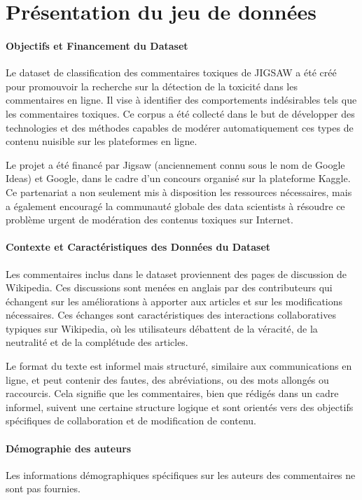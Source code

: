 
\chapter{Présentation du jeu de données}

\subsubsection*{Objectifs et Financement du Dataset}
Le dataset de classification des commentaires toxiques de JIGSAW a été créé pour promouvoir la recherche sur la détection de la toxicité dans les commentaires en ligne.
Il vise à identifier des comportements indésirables tels que les commentaires toxiques.
Ce corpus a été collecté dans le but de développer des technologies et des méthodes capables de modérer automatiquement ces types de contenu nuisible sur les plateformes en ligne.

Le projet a été financé par Jigsaw (anciennement connu sous le nom de Google Ideas) et Google, dans le cadre d'un concours organisé sur la plateforme Kaggle. 
Ce partenariat a non seulement mis à disposition les ressources nécessaires, mais a également encouragé la communauté globale des data scientists à résoudre ce problème urgent de modération des contenus toxiques sur Internet.

\subsubsection*{Contexte et Caractéristiques des Données du Dataset }
Les commentaires inclus dans le dataset proviennent des pages de discussion de Wikipedia. 
Ces discussions sont menées en anglais par des contributeurs qui échangent sur les améliorations à apporter aux articles et sur les modifications nécessaires. 
Ces échanges sont caractéristiques des interactions collaboratives typiques sur Wikipedia, où les utilisateurs débattent de la véracité, de la neutralité et de la complétude des articles.

Le format du texte est informel mais structuré, similaire aux communications en ligne, et peut contenir des fautes, des abréviations, ou des mots allongés ou raccourcis.
Cela signifie que les commentaires, bien que rédigés dans un cadre informel, suivent une certaine structure logique et sont orientés vers des objectifs spécifiques de collaboration et de modification de contenu.

\subsubsection*{Démographie des auteurs}
Les informations démographiques spécifiques sur les auteurs des commentaires ne sont pas fournies.

